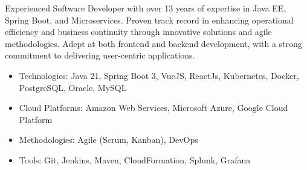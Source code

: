 \documentclass{resume}
\begin{document}
  \noindent
  \linebreak
  Experienced Software Developer with over 13 years of expertise in Java EE, Spring Boot, and Microservices. Proven track record in enhancing operational efficiency and business continuity through innovative solutions and agile methodologies. Adept at both frontend and backend development, with a strong commitment to delivering user-centric applications.

  \begin{itemize}
    \item Technologies: Java 21, Spring Boot 3, VueJS, ReactJs, Kubernetes, Docker, PostgreSQL, Oracle, MySQL
    \item Cloud Platforms: Amazon Web Services, Microsoft Azure, Google Cloud Platform
    \item Methodologies: Agile (Scrum, Kanban), DevOps
    \item Tools: Git, Jenkins, Maven, CloudFormation, Splunk, Grafana
  \end{itemize}
\end{document}

